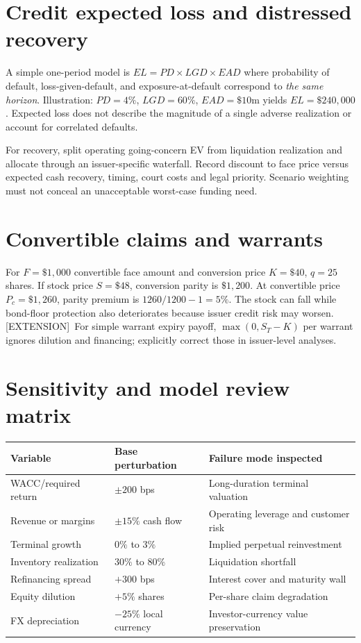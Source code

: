 \documentclass[11pt,letterpaper]{article}
\newcommand{\ext}{\textsf{\color{gold}[EXTENSION]}}
\begin{document}
\section{Credit expected loss and distressed recovery}
A simple one-period model is $EL=PD\times LGD\times EAD$ where probability of default, loss-given-default, and exposure-at-default correspond to \emph{the same horizon}. Illustration: $PD=4\%$, $LGD=60\%$, $EAD=\$10$m yields $EL=\$240{,}000$. Expected loss does not describe the magnitude of a single adverse realization or account for correlated defaults.

For recovery, split operating going-concern EV from liquidation realization and allocate through an issuer-specific waterfall. Record discount to face price versus expected cash recovery, timing, court costs and legal priority. Scenario weighting must not conceal an unacceptable worst-case funding need.

\section{Convertible claims and warrants}
For $F=\$1{,}000$ convertible face amount and conversion price $K=\$40$, $q=25$ shares. If stock price $S=\$48$, conversion parity is $\$1{,}200$. At convertible price $P_c=\$1{,}260$, parity premium is $1260/1200-1=5\%$. The stock can fall while bond-floor protection also deteriorates because issuer credit risk may worsen. \ext\ For simple warrant expiry payoff, $\max(0,S_T-K)$ per warrant ignores dilution and financing; explicitly correct those in issuer-level analyses.

\section{Sensitivity and model review matrix}
\begin{center}\small\begin{tabularx}{\textwidth}{p{}X X}\toprule Variable & Base perturbation & Failure mode inspected \\
\midrule WACC/required return & $\pm 200$ bps & Long-duration terminal valuation \\
Revenue or margins & $\pm 15\%$ cash flow & Operating leverage and customer risk \\
Terminal growth & $0\%$ to $3\%$ & Implied perpetual reinvestment \\
Inventory realization & $30\%$ to $80\%$ & Liquidation shortfall \\
Refinancing spread & $+300$ bps & Interest cover and maturity wall \\
Equity dilution & $+5\%$ shares & Per-share claim degradation \\
FX depreciation & $-25\%$ local currency & Investor-currency value preservation \\
\bottomrule\end{tabularx}\end{center}
\end{document}
